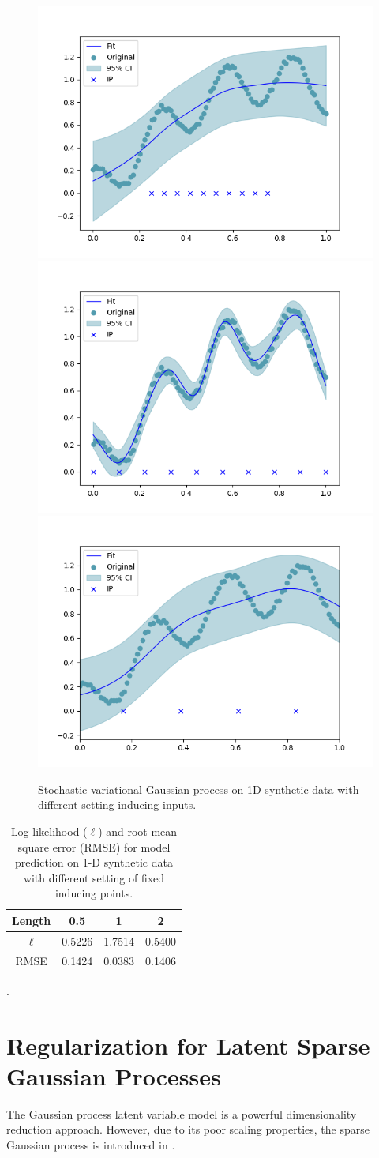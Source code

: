 \documentclass{article}
\begin{document}
\begin{figure}[ht!]
	\centering
	\includegraphics[width = 0.32\linewidth]{pic/1D_sim_SVGP_Fixed_Z0}
	\includegraphics[width = 0.32\linewidth]{pic/1D_sim_SVGP_Fixed_Z1}
	\includegraphics[width = 0.32\linewidth]{pic/1D_sim_SVGP_Fixed_Z2}
	\caption{Stochastic variational Gaussian process on 1D synthetic data with different setting inducing inputs.}
	\label{fig:SGP}
\end{figure} 
\begin{table}[ht!]
	\centering
	\begin{tabular}{|c|c|c|c|}
		\hline
		Length & 0.5 & 1 & 2 \\
		\hline
		$\ell$ & 0.5226 & 1.7514 & 0.5400  \\
		\hline 
		RMSE & 0.1424 & 0.0383 & 0.1406  \\
		\hline
	\end{tabular}
    \caption{Log likelihood ($\ell$) and root mean square error (RMSE) for model prediction on 1-D synthetic data with different setting of fixed inducing points.}
    \label{tab:SGP}.
\end{table}
	
\section{Regularization for Latent Sparse Gaussian Processes}	\label{sec:R}
The Gaussian process latent variable model is a powerful dimensionality reduction approach. However, due to its poor scaling properties, the sparse Gaussian process is introduced in \cite{Titsias_2010, Hensman_2013}. 
\end{document}
